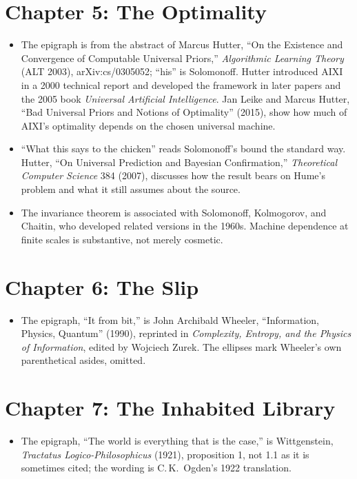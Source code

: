 \section*{Chapter 5: The Optimality}

\begin{itemize}
\setlength{\itemsep}{0.5em}
\item The epigraph is from the abstract of Marcus Hutter, ``On the Existence and Convergence of Computable Universal Priors,'' \textit{Algorithmic Learning Theory} (ALT 2003), arXiv:cs/0305052; ``his'' is Solomonoff. Hutter introduced AIXI in a 2000 technical report and developed the framework in later papers and the 2005 book \textit{Universal Artificial Intelligence}. Jan Leike and Marcus Hutter, ``Bad Universal Priors and Notions of Optimality'' (2015), show how much of AIXI's optimality depends on the chosen universal machine.
\item ``What this says to the chicken'' reads Solomonoff's bound the standard way. Hutter, ``On Universal Prediction and Bayesian Confirmation,'' \textit{Theoretical Computer Science} 384 (2007), discusses how the result bears on Hume's problem and what it still assumes about the source.
\item The invariance theorem is associated with Solomonoff, Kolmogorov, and Chaitin, who developed related versions in the 1960s. Machine dependence at finite scales is substantive, not merely cosmetic.
\end{itemize}

\section*{Chapter 6: The Slip}

\begin{itemize}
\setlength{\itemsep}{0.5em}
\item The epigraph, ``It from bit,'' is John Archibald Wheeler, ``Information, Physics, Quantum'' (1990), reprinted in \textit{Complexity, Entropy, and the Physics of Information}, edited by Wojciech Zurek. The ellipses mark Wheeler's own parenthetical asides, omitted.
\end{itemize}

\section*{Chapter 7: The Inhabited Library}

\begin{itemize}
\setlength{\itemsep}{0.5em}
\item The epigraph, ``The world is everything that is the case,'' is Wittgenstein, \textit{Tractatus Logico-Philosophicus} (1921), proposition 1, not 1.1 as it is sometimes cited; the wording is C.\,K.\ Ogden's 1922 translation.
\end{itemize}

